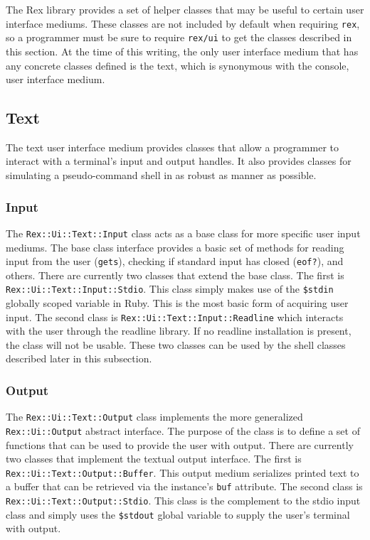 \documentclass{report}
\begin{document}
\par
The Rex library provides a set of helper classes that may be useful
to certain user interface mediums.  These classes are not included
by default when requiring \texttt{rex}, so a programmer must be sure
to require \texttt{rex/ui} to get the classes described in this
section.  At the time of this writing, the only user interface
medium that has any concrete classes defined is the text, which is
synonymous with the console, user interface medium.

        \subsection{Text}

\par
The text user interface medium provides classes that allow a
programmer to interact with a terminal's input and output handles.
It also provides classes for simulating a pseudo-command shell in as
robust as manner as possible.

            \subsubsection{Input}

\par
The \texttt{Rex::Ui::Text::Input} class acts as a base class for
more specific user input mediums.  The base class interface provides
a basic set of methods for reading input from the user
(\texttt{gets}), checking if standard input has closed
(\texttt{eof?}), and others.  There are currently two classes that
extend the base class.  The first is
\texttt{Rex::Ui::Text::Input::Stdio}.  This class simply makes use
of the \texttt{\$stdin} globally scoped variable in Ruby.  This is
the most basic form of acquiring user input.  The second class is
\texttt{Rex::Ui::Text::Input::Readline} which interacts with the
user through the readline library.  If no readline installation is
present, the class will not be usable.  These two classes can be
used by the shell classes described later in this subsection.

            \subsubsection{Output}

The \texttt{Rex::Ui::Text::Output} class implements the more
generalized \texttt{Rex::Ui::Output} abstract interface.  The
purpose of the class is to define a set of functions that can be
used to provide the user with output.  There are currently two
classes that implement the textual output interface.  The first is
\texttt{Rex::Ui::Text::Output::Buffer}.  This output medium
serializes printed text to a buffer that can be retrieved via the
instance's \texttt{buf} attribute.  The second class is
\texttt{Rex::Ui::Text::Output::Stdio}.  This class is the complement
to the stdio input class and simply uses the \texttt{\$stdout}
global variable to supply the user's terminal with output.
\end{document}
